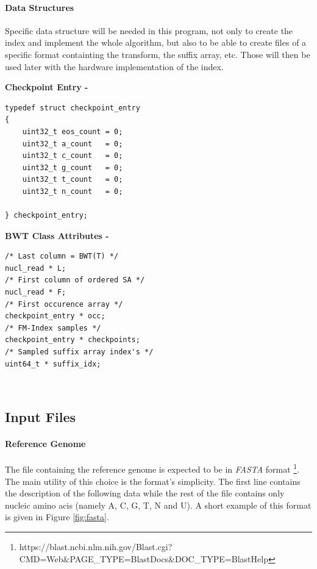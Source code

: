 \paragraph{Data Structures}

Specific data structure will be needed in this program, not only to create the index and implement the whole algorithm, but also to be able to create files of a specific format containting the transform, the suffix array, etc. Those will then be used later with the hardware implementation of the index.

\begin{minipage}[t]{0.4\textwidth}
	\textbf{Checkpoint Entry -} \\
	\vspace{-5mm}
	\begin{verbatim}   
typedef struct checkpoint_entry
{
    uint32_t eos_count = 0;
    uint32_t a_count   = 0;
    uint32_t c_count   = 0;
    uint32_t g_count   = 0;
    uint32_t t_count   = 0;
    uint32_t n_count   = 0;
	
} checkpoint_entry;
	\end{verbatim}
\end{minipage}
\hspace*{15mm}
\begin{minipage}[t]{0.5\textwidth}
		\textbf{BWT Class Attributes - }
\begin{verbatim}
/* Last column = BWT(T) */
nucl_read * L;
/* First column of ordered SA */
nucl_read * F;	
/* First occurence array */
checkpoint_entry * occ;	
/* FM-Index samples */
checkpoint_entry * checkpoints; 
/* Sampled suffix array index's */
uint64_t * suffix_idx;	

	\end{verbatim}
	\textcolor{white}{.}\\

	
	
\end{minipage}

\subsection{Input Files}

\paragraph{Reference Genome}
The file containing the reference genome is expected to be in \textsl{FASTA} format \footnote{https://blast.ncbi.nlm.nih.gov/Blast.cgi?CMD=Web&PAGE_TYPE=BlastDocs&DOC_TYPE=BlastHelp}. The main utility of this choice is the format's simplicity. The first line contains the description of the following data while the rest of the file contains only nucleic amino acis (namely A, C, G, T, N and U). A short example of this format is given in Figure \ref{fig:fasta}.

